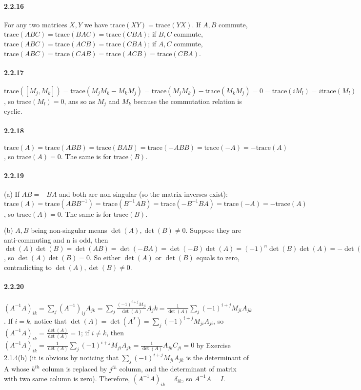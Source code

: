 \documentclass[a4paper]{article}
\begin{document}
\newcommand{\trace}{\mathrm{trace}}

\paragraph{2.2.16}
For any two matrices $X,Y$ we have $\trace(XY)=\trace(YX)$. If $A,B$ commute, $\trace(ABC)=\trace(BAC)=\trace(CBA)$; if $B,C$ commute, $\trace(ABC)=\trace(ACB)=\trace(CBA)$; if $A,C$ commute, $\trace(ABC)=\trace(CAB)=\trace(ACB)=\trace(CBA)$.

\paragraph{2.2.17}
$\trace([M_j,M_k])=\trace(M_jM_k-M_kM_j)=\trace(M_jM_k)-\trace(M_kM_j)=0=\trace(iM_l)=i\trace(M_l)$, so $\trace(M_l)=0$, ans so as $M_j$ and $M_k$ because the commutation relation is cyclic.

\paragraph{2.2.18}
$\trace(A)=\trace(ABB)=\trace(BAB)=\trace(-ABB)=\trace(-A)=-\trace(A)$, so $\trace(A)=0$. The same is for $\trace(B)$.

\paragraph{2.2.19}
(a) If $AB=-BA$ and both are non-singular (so the matrix inverses exist): $\trace(A)=\trace(ABB^{-1})=\trace(B^{-1}AB)=\trace(-B^{-1}BA)=\trace(-A)=-\trace(A)$, so $\trace(A)=0$. The same is for $\trace(B)$.

(b) $A,B$ being non-singular means $\det(A),\det(B)\neq0$. Suppose they are anti-commuting and n is odd, then $\det(A)\det(B)=\det(AB)=\det(-BA)=\det(-B)\det(A)=(-1)^n\det(B)\det(A)=-\det(A)\det(B)$, so $\det(A)\det(B)=0$. So either  $\det(A)$ or $\det(B)$ equals to zero, contradicting to $\det(A),\det(B)\neq0$. 

\paragraph{2.2.20}
$(A^{-1}A)_{ik}=\sum_j(A^{-1})_{ij}A_{jk}=\sum_j\frac{(-1)^{i+j}M_{ji}}{\det(A)}A_jk=\frac{1}{\det(A)}\sum_j(-1)^{i+j}M_{ji}A_{jk}$. If $i=k$, notice that $\det(A)=\det(A^T)=\sum_{j}(-1)^{i+j}M_{ji}A_{ji}$, so $(A^{-1}A)_{ik}=\frac{\det(A)}{\det(A)}=1$; if $i\neq k$, then $(A^{-1}A)_{ik}=\frac{1}{\det(A)}\sum_{j}(-1)^{i+j}M_{ji}A_{jk}=\frac{1}{\det(A)}A_{jk}C_{ji}=0$ by Exercise 2.1.4(b) (it is obvious by noticing that $\sum_{j}(-1)^{i+j}M_{ji}A_{jk}$ is the determinant of A whose $k^{th}$ column is replaced by $j^{th}$ column, and the determinant of matrix with two same column is zero). Therefore, $(A^{-1}A)_{ik}=\delta_{ik}$, so $A^{-1}A=I$.
\end{document}
